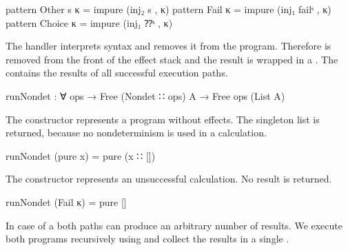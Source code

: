 \begin{code}
pattern Other s κ  = impure (inj₂ s , κ)
pattern Fail κ     = impure (inj₁ failˢ , κ)
pattern Choice κ   = impure (inj₁ ⁇ˢ , κ)
\end{code}
\begin{AgdaAlign}
  The handler interprets  syntax and removes it from the
  program.
  Therefore  is removed from the front of the effect stack
  and the result is wrapped in a .
  The  contains the results of all successful execution
  paths.
  \begin{code}
runNondet : ∀ {ops} → Free (Nondet ∷ ops) A → Free ops (List A)
  \end{code}
  The  constructor represents a program without
  effects.
  The singleton list is returned, because no nondeterminism is used in a
   calculation.
  \begin{code}
runNondet (pure x)     = pure (x ∷ [])
  \end{code}
  The  constructor represents an unsuccessful
  calculation.
  No result is returned.
  \begin{code}
runNondet (Fail κ)     = pure []
  \end{code}
  In case of a  both paths can produce an
  arbitrary number of results.
  We execute both programs recursively using  and
  collect the results in a single .


\end{AgdaAlign}
